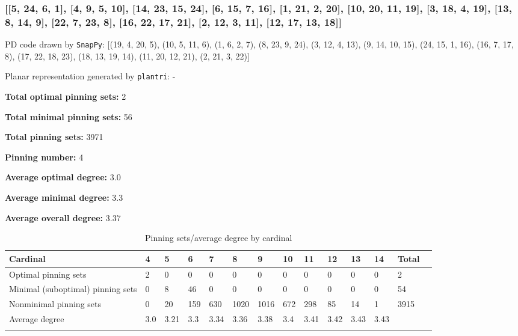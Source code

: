 \documentclass{article}%
\begin{document}
\subsubsection{[[5, 24, 6, 1], [4, 9, 5, 10], [14, 23, 15, 24], [6, 15, 7, 16], [1, 21, 2, 20], [10, 20, 11, 19], [3, 18, 4, 19], [13, 8, 14, 9], [22, 7, 23, 8], [16, 22, 17, 21], [2, 12, 3, 11], [12, 17, 13, 18]]}

{\small\noindent PD code drawn by \texttt{SnapPy}: [(19, 4, 20, 5), (10, 5, 11, 6), (1, 6, 2, 7), (8, 23, 9, 24), (3, 12, 4, 13), (9, 14, 10, 15), (24, 15, 1, 16), (16, 7, 17, 8), (17, 22, 18, 23), (18, 13, 19, 14), (11, 20, 12, 21), (2, 21, 3, 22)]}

{\small\noindent Planar representation generated by \texttt{plantri}: -}

\begin{multicols}{2}
{\normalsize \noindent\textbf{Total optimal pinning sets:} 2

\noindent\textbf{Total minimal pinning sets:} 56

\noindent\textbf{Total pinning sets:} 3971

\noindent\textbf{Pinning number:} 4

}
\columnbreak

{\normalsize \noindent\textbf{Average optimal degree:} 3.0

\noindent\textbf{Average minimal degree:} 3.3

\noindent\textbf{Average overall degree:} 3.37

}
\end{multicols}

\begin{table}[ht]
	\caption{Pinning sets/average degree by cardinal}
	\centering
	\renewcommand{\arraystretch}{1.5}
	\begin{tabularx}{\textwidth}{lXXXXXXXXXXXXX}
		\toprule
			Cardinal & 4 & 5 & 6 & 7 & 8 & 9 & 10 & 11 & 12 & 13 & 14 & Total\\
			\hline
			Optimal pinning sets & 2 & 0 & 0 & 0 & 0 & 0 & 0 & 0 & 0 & 0 & 0 & 2 \\
			Minimal (suboptimal) pinning sets & 0 & 8 & 46 & 0 & 0 & 0 & 0 & 0 & 0 & 0 & 0 & 54 \\
			Nonminimal pinning sets & 0 & 20 & 159 & 630 & 1020 & 1016 & 672 & 298 & 85 & 14 & 1 & 3915 \\
			Average degree & 3.0 & 3.21 & 3.3 & 3.34 & 3.36 & 3.38 & 3.4 & 3.41 & 3.42 & 3.43 & 3.43 &  \\
		\bottomrule \\ 
	\end{tabularx}
\end{table}
\end{document}
